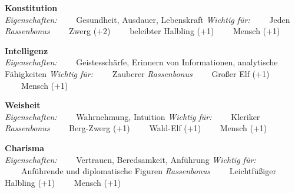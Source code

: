 \begin{dndtable}
	\textbf{Konstitution} \\
	\textit{Eigenschaften:} \newline
	\ \ \ \ Gesundheit, Ausdauer, Lebenskraft \newline
	\textit{Wichtig für:} \newline
	\ \ \ \ Jeden \newline
	\textit{Rassenbonus} \newline
	\ \ \ \ Zwerg (+2) \newline
	\ \ \ \ beleibter Halbling (+1) \newline
	\ \ \ \ Mensch (+1)
\end{dndtable}

\begin{dndtable}
	\textbf{Intelligenz} \\
	\textit{Eigenschaften:} \newline
	\ \ \ \ Geistesschärfe, Erinnern von Informationen, analytische Fähigkeiten \newline
	\textit{Wichtig für:} \newline
	\ \ \ \ Zauberer \newline
	\textit{Rassenbonus} \newline
	\ \ \ \ Großer Elf (+1) \newline
	\ \ \ \ Mensch (+1)
\end{dndtable}

\begin{dndtable}
	\textbf{Weisheit} \\
	\textit{Eigenschaften:} \newline
	\ \ \ \ Wahrnehmung, Intuition \newline
	\textit{Wichtig für:} \newline
	\ \ \ \ Kleriker \newline
	\textit{Rassenbonus} \newline
	\ \ \ \ Berg-Zwerg (+1) \newline
	\ \ \ \ Wald-Elf (+1) \newline
	\ \ \ \ Mensch (+1)
\end{dndtable}

\begin{dndtable}
	\textbf{Charisma} \\
	\textit{Eigenschaften:} \newline
	\ \ \ \ Vertrauen, Beredsamkeit, Anführung \newline
	\textit{Wichtig für:} \newline
	\ \ \ \ Anführende und diplomatische Figuren \newline
	\textit{Rassenbonus} \newline
	\ \ \ \ Leichtfüßiger Halbling (+1) \newline
	\ \ \ \ Mensch (+1)
\end{dndtable}
